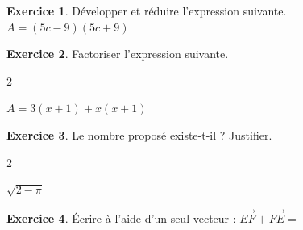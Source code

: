 \documentclass{exam}
\theoremstyle{definition}
\newtheorem{exercice}{Exercice}
\begin{document}
\large


\vspace{2mm}


\vspace{2mm}

\begin{exercice}

Développer et réduire l'expression suivante.
 $A = (5c-9)(5c+9)$
\end{exercice}

\begin{exercice}

Factoriser l'expression suivante.\begin{multicols}{2}
 \begin{minipage}[t]{\linewidth} $A = 3(x+1)+x(x+1)$ \end{minipage}
\end{multicols}
\end{exercice}

\begin{exercice}

 Le nombre proposé existe-t-il ? Justifier.\begin{multicols}{2}
 \begin{minipage}[t]{\linewidth} $\sqrt{2-\pi}$ \end{minipage}
\end{multicols}
\end{exercice}

\begin{exercice}


 Écrire à l'aide d'un seul vecteur :
        $\overrightarrow{EF}+\overrightarrow{FE}=$
\end{exercice}
\end{document}
